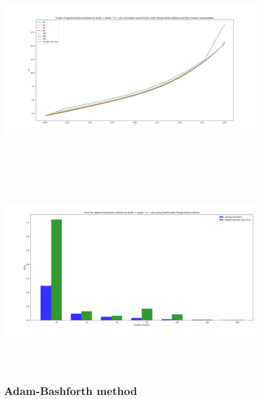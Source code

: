 \documentclass[10pt]{article}
\begin{document}
\begin{center}
\includegraphics[angle=0,height=10cm]{./img/runge_4_function.png}
\end{center}

\begin{center}
\includegraphics[angle=0,height=10cm]{./img/runge_4_error.png}
\end{center}




\subsection{Adam-Bashforth method}
\label{sec:orge87f3e1}
\end{document}

